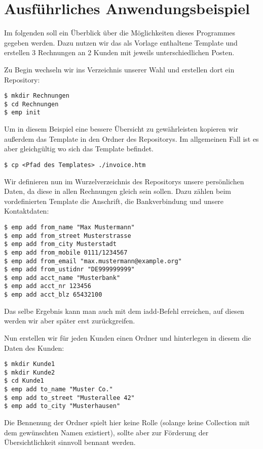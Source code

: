
\section{Ausführliches Anwendungsbeispiel}
Im folgenden soll ein Überblick über die Möglichkeiten dieses Programmes gegeben werden. Dazu nutzen wir das als Vorlage enthaltene Template und erstellen 3 Rechnungen an 2 Kunden mit jeweils unterschiedlichen Posten.

Zu Begin wechseln wir ins Verzeichnis unserer Wahl und erstellen dort ein Repository:
\begin{lstlisting}[style=Bash]
$ mkdir Rechnungen
$ cd Rechnungen
$ emp init
\end{lstlisting}

Um in diesem Beispiel eine bessere Übersicht zu gewährleisten kopieren wir außerdem das Template in den Ordner des Repositorys. Im allgemeinen Fall ist es aber gleichgültig wo sich das Template befindet.
\begin{lstlisting}[style=Bash]
$ cp <Pfad des Templates> ./invoice.htm
\end{lstlisting}


Wir definieren nun im Wurzelverzeichnis des Repositorys unsere persönlichen Daten, da diese in allen Rechnungen gleich sein sollen. Dazu zählen beim vordefinierten Template die Anschrift, die Bankverbindung und unsere Kontaktdaten:

\begin{lstlisting}[style=Bash]
$ emp add from_name "Max Mustermann"
$ emp add from_street Musterstrasse
$ emp add from_city Musterstadt
$ emp add from_mobile 0111/1234567
$ emp add from_email "max.mustermann@example.org"
$ emp add from_ustidnr "DE999999999"
$ emp add acct_name "Musterbank"
$ emp add acct_nr 123456
$ emp add acct_blz 65432100
\end{lstlisting}

Das selbe Ergebnis kann man auch mit dem iadd-Befehl erreichen, auf diesen werden wir aber später erst zurückgreifen.


Nun erstellen wir für jeden Kunden einen Ordner und hinterlegen in diesem die Daten des Kunden:
\begin{lstlisting}[style=Bash]
$ mkdir Kunde1
$ mkdir Kunde2
$ cd Kunde1
$ emp add to_name "Muster Co."
$ emp add to_street "Musterallee 42"
$ emp add to_city "Musterhausen"
\end{lstlisting}

Die Bennenung der Ordner spielt hier keine Rolle (solange keine Collection mit dem gewünschten Namen existiert), sollte aber zur Förderung der Übersichtlichkeit sinnvoll bennant werden.

